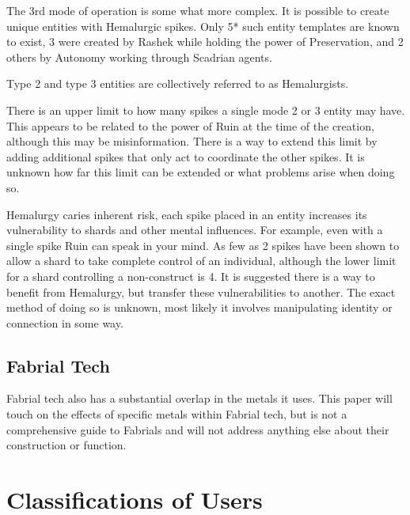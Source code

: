 \documentclass[conference]{IEEEtran}
\newcommand{\n}{\hfill\break}
\begin{document}
The 3rd mode of operation is some what more complex.  It is possible to create unique entities with Hemalurgic spikes.\cite{WoF}  Only 5* such entity templates are known to exist, 3 were created by Rashek while holding the power of Preservation,\cite{WoF} and 2 others by Autonomy working through Scadrian agents.\cite{SoS-CH21}\cite{TLM-CH53} 

Type 2 and type 3 entities are collectively referred to as Hemalurgists.\cite{hemalurgist}  

There is an upper limit to how many spikes a single mode 2 or 3 entity may have.  This appears to be related to the power of Ruin at the time of the creation, although this may be misinformation.\cite{ARS-TLM}  There is a way to extend this limit by adding additional spikes that only act to coordinate the other spikes.\cite{TLM-CH15} It is unknown how far this limit can be extended or what problems arise when doing so.

Hemalurgy caries inherent risk, each spike placed in an entity increases its vulnerability to shards and other mental influences.\cite{HE-Shard}\cite{HoA-CH58}\cite{HoA-CH13}\cite{HoA-CH77}  For example, even with a single spike Ruin can speak in your mind.\cite{HoA-CH65}  As few as 2 spikes have been shown to allow a shard to take complete control of an individual,\cite{SoS-CH7} although the lower limit for a shard controlling a non-construct is 4.\cite{BoM-CH27}  It is suggested there is a way to benefit from Hemalurgy, but transfer these vulnerabilities to another.\cite{BoM-CH27}  The exact method of doing so is unknown, most likely it involves manipulating identity or connection in some way.
\subsection*{\textbf{Fabrial Tech}}
Fabrial tech also has a substantial overlap in the metals it uses.\cite{RoW-E7}  This paper will touch on the effects of specific metals within Fabrial tech, but is not a comprehensive guide to Fabrials and will not address anything else about their construction or function.
\n
\section{\textbf{Classifications of Users}}
\end{document}
